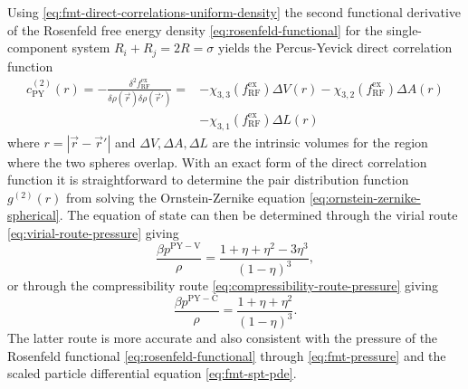 \begin{tcolorbox}[title=Percus-Yevick theory in hard spheres]
  Using \eqref{eq:fmt-direct-correlations-uniform-density} the second functional derivative of the Rosenfeld free energy density \eqref{eq:rosenfeld-functional} for the single-component system $R_i + R_j = 2R = \sigma$ yields the Percus-Yevick direct correlation function \cite{RosenfeldJCP1988,WertheimPRL1963}
  \begin{align}
    c^{(2)}_\mathrm{PY}(r)
    =
    - \frac{\delta^2 f_\mathrm{RF}^\mathrm{ex}}{\delta \rho(\vec{r}) \delta \rho(\vec{r}')}
    =&
    - \chi_{3,3}(f_\mathrm{RF}^\mathrm{ex}) \Delta V(r)
    - \chi_{3,2}(f_\mathrm{RF}^\mathrm{ex}) \Delta A(r)
    \nonumber \\ &
    - \chi_{3,1}(f_\mathrm{RF}^\mathrm{ex}) \Delta L(r)
  \end{align}
  where $r = |\vec{r} - \vec{r}'|$ and $\Delta V, \Delta A, \Delta L$ are the intrinsic volumes for the region where the two spheres overlap.
  With an exact form of the direct correlation function it is straightforward to determine the pair distribution function $g^{(2)}(r)$ from solving the Ornstein-Zernike equation \eqref{eq:ornstein-zernike-spherical}.
  The equation of state can then be determined through the virial route \eqref{eq:virial-route-pressure} giving
  \begin{equation}
    \frac{\beta p^\mathrm{PY-V}}{\rho}
    =
    \frac{1 + \eta + \eta^2 - 3\eta^3}{(1 - \eta)^3},
  \end{equation}
  or through the compressibility route \eqref{eq:compressibility-route-pressure} giving
  \begin{equation}\label{eq:pyc-pressure}
    \frac{\beta p^\mathrm{PY-C}}{\rho}
    =
    \frac{1 + \eta + \eta^2}{(1 - \eta)^3}.
  \end{equation}
  The latter route is more accurate and also consistent with the pressure of the Rosenfeld functional \eqref{eq:rosenfeld-functional} through \eqref{eq:fmt-pressure} and the scaled particle differential equation%
  \eqref{eq:fmt-spt-pde}.
\end{tcolorbox}

